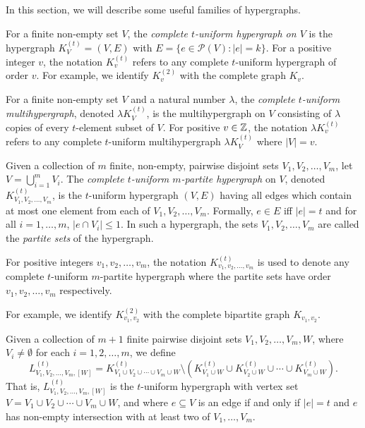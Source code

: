 In this section, we will describe some useful families of hypergraphs.

For a finite non-empty set $V$, the {\em complete $t$-uniform hypergraph on $V$}
is the hypergraph $K_V^{(t)} = (V, E)$ with $E = \{e \in \mathcal{P}(V) : |e| = k\}$.
For a positive integer $v$, the notation $K_v^{(t)}$ refers to any complete
$t$-uniform hypergraph of order $v$.
For example, we identify $K_v^{(2)}$ with the complete graph $K_v$.

For a finite non-empty set $V$ and a natural number $\lambda$, the {\em complete
$t$-uniform multihypergraph}, denoted $\lambda K_{V}^{(t)}$, is the
multihypergraph on $V$ consisting of $\lambda$ copies of every $t$-element subset
of $V$. For positive $v \in \mathbb{Z}$, the notation $\lambda K_{v}^{(t)}$ refers to
any complete $t$-uniform multihypergraph $\lambda K_{V}^{(t)}$ where $|V| = v$.

Given a collection of $m$ finite, non-empty, pairwise disjoint sets
$V_1, V_2, \ldots, V_m$, let $V = \bigcup_{i=1}^{m} V_i$.
The {\em complete $t$-uniform $m$-partite hypergraph} on $V$, denoted
$K_{V_1, V_2, \ldots, V_m}^{(t)}$, is the $t$-uniform hypergraph $(V, E)$ having
all edges which contain at most one element from each of $V_1, V_2, \ldots, V_m$.
Formally, $e \in E$ iff $|e| = t$ and for all $i=1,\ldots,m$, $|e \cap V_i| \leq 1$.
In such a hypergraph, the sets $V_1, V_2, \ldots, V_m$ are called the
{\em partite sets} of the hypergraph.

For positive integers $v_1, v_2, \ldots, v_m$, the notation $K_{v_1, v_2,
\ldots, v_m}^{(t)}$ is used to denote any complete $t$-uniform $m$-partite
hypergraph where the partite sets have order $v_1, v_2, \ldots, v_m$
respectively.

For example, we identify $K_{v_1, v_2}^{(2)}$ with the complete bipartite graph
$K_{v_1,v_2}$.

Given a collection of $m+1$ finite pairwise disjoint sets
$V_1, V_2, \ldots, V_m, W$, where $V_i \neq \emptyset$ for each $i = 1, 2, \ldots, m$, we define
\[
    L_{V_1, V_2, \ldots, V_m, [W]}^{(t)} = K_{V_1 \cup V_2 \cup \cdots \cup V_m \cup W}^{(t)} \setminus (K_{V_1 \cup W}^{(t)} \cup K_{V_2 \cup W}^{(t)} \cup \cdots \cup K_{V_m \cup W}^{(t)}).
\]
That is, $L_{V_1, V_2, \ldots, V_m, [W]}^{(t)}$ is the $t$-uniform hypergraph with vertex set $V = V_1 \cup V_2 \cup \cdots \cup V_m \cup W$, and where $e \subseteq V$ is an edge if and only if $|e| = t$ and $e$ has non-empty intersection with at least two of $V_1, \ldots, V_m$.

